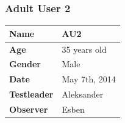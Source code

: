 \subsubsection{Adult User 2}

\begin{table}[H]
\centering
\begin{tabular}{| p{4.0cm} | p{4.0cm} |}
\hline
 \textbf{Name} & AU2 \\
 \hline
 \textbf{Age} & 35 years old \\
 \hline 
 \textbf{Gender} & Male \\
 \hline 
 \textbf{Date} & May 7th, 2014 \\
 \hline
 \textbf{Testleader} & Aleksander \\
 \hline
 \textbf{Observer} & Esben \\
 \hline
\end{tabular}
\end{table}

